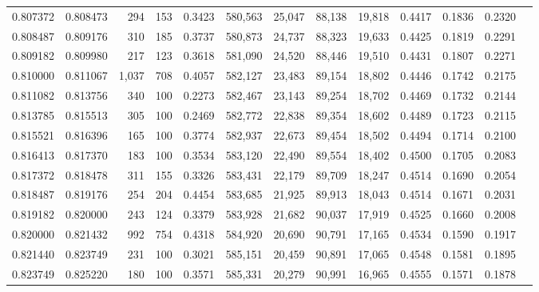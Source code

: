 \begin{tabular}{rrrrrrrrrrrrr}
0.807372 & 0.808473 &   294 & 153 &                                     0.3423 & 580,563 &  25,047 &  88,138 &  19,818 & 0.4417 & 0.1836 & 0.2320 \\
0.808487 & 0.809176 &   310 & 185 &                                     0.3737 & 580,873 &  24,737 &  88,323 &  19,633 & 0.4425 & 0.1819 & 0.2291 \\
0.809182 & 0.809980 &   217 & 123 &                                     0.3618 & 581,090 &  24,520 &  88,446 &  19,510 & 0.4431 & 0.1807 & 0.2271 \\
0.810000 & 0.811067 & 1,037 & 708 &                                     0.4057 & 582,127 &  23,483 &  89,154 &  18,802 & 0.4446 & 0.1742 & 0.2175 \\
0.811082 & 0.813756 &   340 & 100 &                                     0.2273 & 582,467 &  23,143 &  89,254 &  18,702 & 0.4469 & 0.1732 & 0.2144 \\
0.813785 & 0.815513 &   305 & 100 &                                     0.2469 & 582,772 &  22,838 &  89,354 &  18,602 & 0.4489 & 0.1723 & 0.2115 \\
0.815521 & 0.816396 &   165 & 100 &                                     0.3774 & 582,937 &  22,673 &  89,454 &  18,502 & 0.4494 & 0.1714 & 0.2100 \\
0.816413 & 0.817370 &   183 & 100 &                                     0.3534 & 583,120 &  22,490 &  89,554 &  18,402 & 0.4500 & 0.1705 & 0.2083 \\
0.817372 & 0.818478 &   311 & 155 &                                     0.3326 & 583,431 &  22,179 &  89,709 &  18,247 & 0.4514 & 0.1690 & 0.2054 \\
0.818487 & 0.819176 &   254 & 204 &                                     0.4454 & 583,685 &  21,925 &  89,913 &  18,043 & 0.4514 & 0.1671 & 0.2031 \\
0.819182 & 0.820000 &   243 & 124 &                                     0.3379 & 583,928 &  21,682 &  90,037 &  17,919 & 0.4525 & 0.1660 & 0.2008 \\
0.820000 & 0.821432 &   992 & 754 &                                     0.4318 & 584,920 &  20,690 &  90,791 &  17,165 & 0.4534 & 0.1590 & 0.1917 \\
0.821440 & 0.823749 &   231 & 100 &                                     0.3021 & 585,151 &  20,459 &  90,891 &  17,065 & 0.4548 & 0.1581 & 0.1895 \\
0.823749 & 0.825220 &   180 & 100 &                                     0.3571 & 585,331 &  20,279 &  90,991 &  16,965 & 0.4555 & 0.1571 & 0.1878 \\

\end{tabular}
